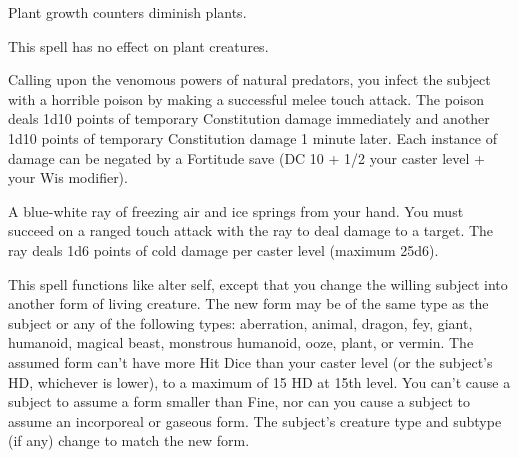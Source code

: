 \begin{multicols}{2}
\begin{small}
{\smallskip\noindent Plant growth counters diminish plants.}

\smallskip\noindent This spell has no effect on plant creatures.

\noindent Calling upon the venomous powers of natural predators, you infect the subject with a horrible poison by making a successful melee touch attack. The poison deals 1d10 points of temporary Constitution damage immediately and another 1d10 points of temporary Constitution damage 1 minute later. Each instance of damage can be negated by a Fortitude save (DC 10 + 1/2 your caster level + your Wis modifier).

\noindent A blue-white ray of freezing air and ice springs from your hand. You must succeed on a ranged touch attack with the ray to deal damage to a target. The ray deals 1d6 points of cold damage per caster level (maximum 25d6).


\noindent This spell functions like alter self, except that you change the willing subject into another form of living creature. The new form may be of the same type as the subject or any of the following types: aberration, animal, dragon, fey, giant, humanoid, magical beast, monstrous humanoid, ooze, plant, or vermin. The assumed form can't have more Hit Dice than your caster level (or the subject's HD, whichever is lower), to a maximum of 15 HD at 15th level. You can't cause a subject to assume a form smaller than Fine, nor can you cause a subject to assume an incorporeal or gaseous form. The subject's creature type and subtype (if any) change to match the new form.


\end{small}
\end{multicols}
